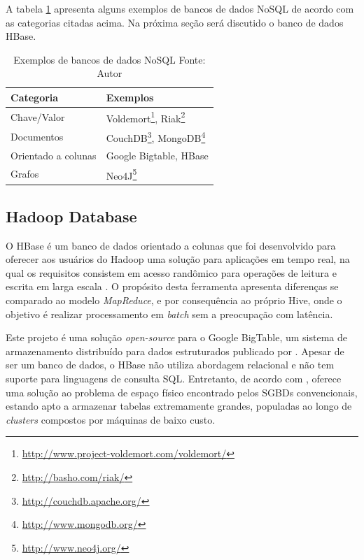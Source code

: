 A tabela \ref{tab-nosql} apresenta alguns exemplos de bancos de dados NoSQL de acordo com as categorias citadas acima. Na próxima seção será discutido o banco de dados HBase.

\begin{savenotes}
\begin{table}[!ht]
\begin{center}
  \begin{tabular}{|p{5cm}|p{3cm}|}
	\hline
	Categoria & Exemplos
	\\ \hline
	Chave/Valor & Voldemort\footnote{\url{http://www.project-voldemort.com/voldemort/}}, Riak\footnote{\url{http://basho.com/riak/}}
	\\ \hline
	Documentos & CouchDB\footnote{\url{http://couchdb.apache.org/}}, MongoDB\footnote{\url{http://www.mongodb.org/}}
	\\ \hline
	Orientado a colunas & Google Bigtable, HBase
	\\ \hline
	Grafos & Neo4J\footnote{\url{http://www.neo4j.org/}}
	\\ \hline
  \end{tabular}
  \captionsetup{justification=centering}
  \caption[Exemplos de bancos de dados NoSQL]{Exemplos de bancos de dados NoSQL
  \protect\linebreak Fonte: Autor}
\label{tab-nosql}
\end{center}
\end{table}
\end{savenotes}
\FloatBarrier

\subsection{Hadoop Database}

O HBase é um banco de dados orientado a colunas que foi desenvolvido para oferecer aos usuários do Hadoop uma solução para aplicações em tempo real, na qual os requisitos consistem em acesso randômico para operações de leitura e escrita em larga escala \cite{white2012}. O propósito desta ferramenta apresenta diferenças se comparado ao modelo \textit{MapReduce}, e por consequência ao próprio Hive, onde o objetivo é realizar processamento em \textit{batch} sem a preocupação com latência.

Este projeto é uma solução \textit{open-source} para o Google BigTable, um sistema de armazenamento distribuído para dados estruturados publicado por . Apesar de ser um banco de dados, o HBase não utiliza abordagem relacional e não tem suporte para linguagens de consulta SQL. Entretanto, de acordo com , oferece uma solução ao problema de espaço físico encontrado pelos SGBDs convencionais, estando apto a armazenar tabelas extremamente grandes, populadas ao longo de \textit{clusters} compostos por máquinas de baixo custo.

